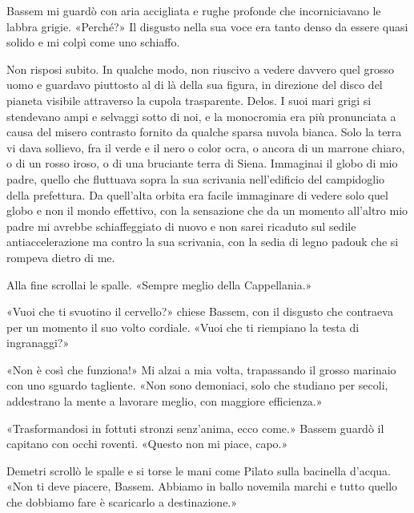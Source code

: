 Bassem mi guardò con aria accigliata e rughe profonde che incorniciavano
le labbra grigie. «Perché?» Il disgusto nella sua voce era tanto denso
da essere quasi solido e mi colpì come uno schiaffo.

Non risposi subito. In qualche modo, non riuscivo a vedere davvero quel
grosso uomo e guardavo piuttosto al di là della sua figura, in direzione
del disco del pianeta visibile attraverso la cupola trasparente. Delos.
I suoi mari grigi si stendevano ampi e selvaggi sotto di noi, e la
monocromia era più pronunciata a causa del misero contrasto fornito da
qualche sparsa nuvola bianca. Solo la terra vi dava sollievo, fra il
verde e il nero o color ocra, o ancora di un marrone chiaro, o di un
rosso iroso, o di una bruciante terra di Siena. Immaginai il globo di
mio padre, quello che fluttuava sopra la sua scrivania nell'edificio del
campidoglio della prefettura. Da quell'alta orbita era facile immaginare
di vedere solo quel globo e non il mondo effettivo, con la sensazione
che da un momento all'altro mio padre mi avrebbe schiaffeggiato di nuovo
e non sarei ricaduto sul sedile antiaccelerazione ma contro la sua
scrivania, con la sedia di legno padouk che si rompeva dietro di me.

Alla fine scrollai le spalle. «Sempre meglio della Cappellania.»

«Vuoi che ti svuotino il cervello?» chiese Bassem, con il disgusto che
contraeva per un momento il suo volto cordiale. «Vuoi che ti riempiano
la testa di ingranaggi?»

«Non è così che funziona!» Mi alzai a mia volta, trapassando il grosso
marinaio con uno sguardo tagliente. «Non sono demoniaci, solo che
studiano per secoli, addestrano la mente a lavorare meglio, con maggiore
efficienza.»

«Trasformandosi in fottuti stronzi senz'anima, ecco come.» Bassem guardò
il capitano con occhi roventi. «Questo non mi piace, capo.»

Demetri scrollò le spalle e si torse le mani come Pilato sulla bacinella
d'acqua. «Non ti deve piacere, Bassem. Abbiamo in ballo novemila marchi
e tutto quello che dobbiamo fare è scaricarlo a destinazione.»

